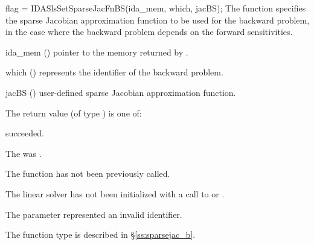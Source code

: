 {
  flag = IDASlsSetSparseJacFnBS(ida\_mem, which, jacBS);
}
{
  The function  specifies the sparse Jacobian
  approximation function to be used for the backward problem, in the case
  where the backward problem depends on the forward sensitivities.
}
{
  \begin{args}
  \item[ida\_mem] ()
    pointer to the {\idas} memory returned by .
  \item[which] ()
    represents the identifier of the backward problem.
  \item[jacBS] ()
    user-defined sparse Jacobian approximation function.
  \end{args}
}
{
  The return value  (of type ) is one of:
  \begin{args}
  \item[\Id{IDASLS\_SUCCESS}] 
     succeeded.
  \item[\Id{IDASLS\_MEM\_NULL}]
    The  was .
  \item[\Id{IDASLS\_NO\_ADJ}]
    The function  has not been previously called.
  \item[\Id{IDASLS\_LMEM\_NULL}]
    The linear solver has not been initialized with a call to 
    or .
  \item[\Id{IDASLS\_ILL\_INPUT}]
    The parameter  represented an invalid identifier.
  \end{args}
}
{
  The function type  is described in \S\ref{ss:sparsejac_b}.
}


